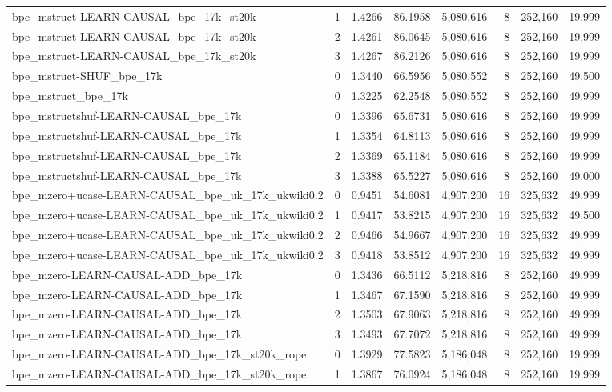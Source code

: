 \begin{tabular}{lrrrrrrr}
bpe\_mstruct-LEARN-CAUSAL\_bpe\_17k\_st20k & 1 & 1.4266 & 86.1958 & 5,080,616 & 8 & 252,160 & 19,999 \\
bpe\_mstruct-LEARN-CAUSAL\_bpe\_17k\_st20k & 2 & 1.4261 & 86.0645 & 5,080,616 & 8 & 252,160 & 19,999 \\
bpe\_mstruct-LEARN-CAUSAL\_bpe\_17k\_st20k & 3 & 1.4267 & 86.2126 & 5,080,616 & 8 & 252,160 & 19,999 \\
bpe\_mstruct-SHUF\_bpe\_17k & 0 & 1.3440 & 66.5956 & 5,080,552 & 8 & 252,160 & 49,500 \\
bpe\_mstruct\_bpe\_17k & 0 & 1.3225 & 62.2548 & 5,080,552 & 8 & 252,160 & 49,999 \\
bpe\_mstructshuf-LEARN-CAUSAL\_bpe\_17k & 0 & 1.3396 & 65.6731 & 5,080,616 & 8 & 252,160 & 49,999 \\
bpe\_mstructshuf-LEARN-CAUSAL\_bpe\_17k & 1 & 1.3354 & 64.8113 & 5,080,616 & 8 & 252,160 & 49,999 \\
bpe\_mstructshuf-LEARN-CAUSAL\_bpe\_17k & 2 & 1.3369 & 65.1184 & 5,080,616 & 8 & 252,160 & 49,999 \\
bpe\_mstructshuf-LEARN-CAUSAL\_bpe\_17k & 3 & 1.3388 & 65.5227 & 5,080,616 & 8 & 252,160 & 49,000 \\
bpe\_mzero+ucase-LEARN-CAUSAL\_bpe\_uk\_17k\_ukwiki0.2 & 0 & 0.9451 & 54.6081 & 4,907,200 & 16 & 325,632 & 49,999 \\
bpe\_mzero+ucase-LEARN-CAUSAL\_bpe\_uk\_17k\_ukwiki0.2 & 1 & 0.9417 & 53.8215 & 4,907,200 & 16 & 325,632 & 49,500 \\
bpe\_mzero+ucase-LEARN-CAUSAL\_bpe\_uk\_17k\_ukwiki0.2 & 2 & 0.9466 & 54.9667 & 4,907,200 & 16 & 325,632 & 49,999 \\
bpe\_mzero+ucase-LEARN-CAUSAL\_bpe\_uk\_17k\_ukwiki0.2 & 3 & 0.9418 & 53.8512 & 4,907,200 & 16 & 325,632 & 49,999 \\
bpe\_mzero-LEARN-CAUSAL-ADD\_bpe\_17k & 0 & 1.3436 & 66.5112 & 5,218,816 & 8 & 252,160 & 49,999 \\
bpe\_mzero-LEARN-CAUSAL-ADD\_bpe\_17k & 1 & 1.3467 & 67.1590 & 5,218,816 & 8 & 252,160 & 49,999 \\
bpe\_mzero-LEARN-CAUSAL-ADD\_bpe\_17k & 2 & 1.3503 & 67.9063 & 5,218,816 & 8 & 252,160 & 49,999 \\
bpe\_mzero-LEARN-CAUSAL-ADD\_bpe\_17k & 3 & 1.3493 & 67.7072 & 5,218,816 & 8 & 252,160 & 49,999 \\
bpe\_mzero-LEARN-CAUSAL-ADD\_bpe\_17k\_st20k\_rope & 0 & 1.3929 & 77.5823 & 5,186,048 & 8 & 252,160 & 19,999 \\
bpe\_mzero-LEARN-CAUSAL-ADD\_bpe\_17k\_st20k\_rope & 1 & 1.3867 & 76.0924 & 5,186,048 & 8 & 252,160 & 19,999 \\

\end{tabular}
